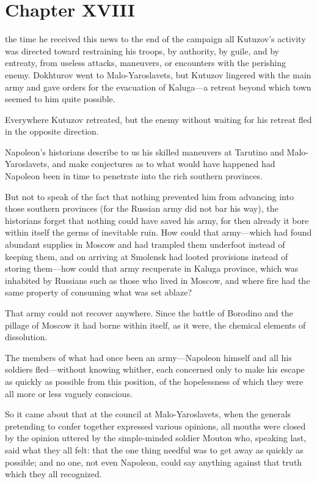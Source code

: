 \chapter*{Chapter XVIII} \ifaudio {}
\fi

 the time he received this news to the end of the campaign
all Kutuzov's activity was directed toward restraining his
troops, by authority, by guile, and by entreaty, from useless
attacks, maneuvers, or encounters with the perishing
enemy. Dokhturov went to Malo-Yaroslavets, but Kutuzov lingered
with the main army and gave orders for the evacuation of
Kaluga---a retreat beyond which town seemed to him quite
possible.

Everywhere Kutuzov retreated, but the enemy without waiting for
his retreat fled in the opposite direction.

Napoleon's historians describe to us his skilled maneuvers at
Tarutino and Malo-Yaroslavets, and make conjectures as to what
would have happened had Napoleon been in time to penetrate into
the rich southern provinces.

But not to speak of the fact that nothing prevented him from
advancing into those southern provinces (for the Russian army did
not bar his way), the historians forget that nothing could have
saved his army, for then already it bore within itself the germs
of inevitable ruin. How could that army---which had found
abundant supplies in Moscow and had trampled them underfoot
instead of keeping them, and on arriving at Smolensk had looted
provisions instead of storing them---how could that army
recuperate in Kaluga province, which was inhabited by Russians
such as those who lived in Moscow, and where fire had the same
property of consuming what was set ablaze?

That army could not recover anywhere. Since the battle of
Borodino and the pillage of Moscow it had borne within itself, as
it were, the chemical elements of dissolution.

The members of what had once been an army---Napoleon himself and
all his soldiers fled---without knowing whither, each concerned
only to make his escape as quickly as possible from this
position, of the hopelessness of which they were all more or less
vaguely conscious.

So it came about that at the council at Malo-Yaroslavets, when
the generals pretending to confer together expressed various
opinions, all mouths were closed by the opinion uttered by the
simple-minded soldier Mouton who, speaking last, said what they
all felt: that the one thing needful was to get away as quickly
as possible; and no one, not even Napoleon, could say anything
against that truth which they all recognized.


